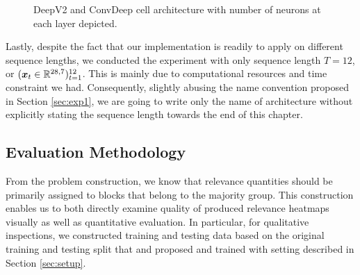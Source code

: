 
\begin{figure}[!htb]
\centering

     \hfill

\caption{DeepV2 and ConvDeep cell architecture with number of neurons at each layer depicted.}
\label{fig:deep_conv_arch}
\end{figure}

Lastly, despite the fact that  our implementation is readily to apply on different sequence lengths,  we conducted the experiment with only sequence length $T=12$, or $(\boldsymbol{x}_t \in \mathbb{R}^{28,7})_{t=1}^{12}$. This is mainly due to computational resources and time constraint we had. Consequently, slightly abusing the name convention proposed in Section \ref{sec:exp1}, we are going to write only the name of architecture without explicitly stating the sequence length towards the end of this chapter.


\subsection{Evaluation Methodology}
\label{sec:evaluation_med}
From the problem construction, we know that relevance quantities should  be primarily assigned to blocks that belong to the majority group. This construction enables us to both directly examine quality of produced relevance heatmaps visually as well as quantitative evaluation.  In particular, for qualitative inspections, we constructed training and testing data based on the original training and testing split that \cite{LeCunMNISThandwrittendigit2010} and \cite{XiaoFashionMNISTNovelImage2017} proposed and trained with setting described in Section \ref{sec:setup}.

